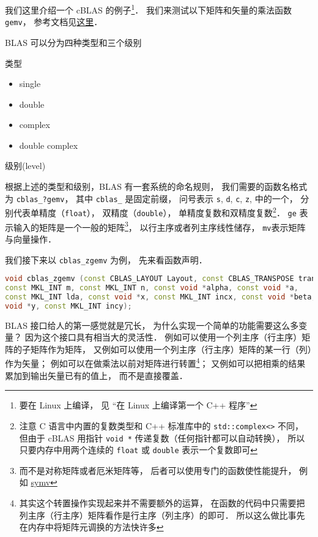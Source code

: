我们这里介绍一个 cBLAS 的例子\footnote{要在 Linux 上编译， 见 “在 Linux 上编译第一个 C++ 程序”}． 我们来测试以下矩阵和矢量的乘法函数 \lstinline|gemv|， 参考文档见\href{https://software.intel.com/en-us/node/834919#88940C4E-0889-46C3-B6CF-F8B6EA6CF4BC}{这里}．

BLAS 可以分为四种类型和三个级别

类型
\begin{itemize}
    \item single
    \item double
    \item complex
    \item double complex
\end{itemize}

级别(level)

根据上述的类型和级别，BLAS 有一套系统的命名规则，
我们需要的函数名格式为 \lstinline|cblas_?gemv|， 其中 \lstinline|cblas_| 是固定前缀， 问号表示 \lstinline|s|, \lstinline|d|, \lstinline|c|, \lstinline|z|, 中的一个， 分别代表单精度（\lstinline|float|）， 双精度（\lstinline|double|）， 单精度复数和双精度复数\footnote{注意 C 语言中内置的复数类型和 C++ 标准库中的 \lstinline|std::complex<>| 不同， 但由于 cBLAS 用指针 \lstinline|void *| 传递复数（任何指针都可以自动转换）， 所以只要内存中用两个连续的 \lstinline|float| 或 \lstinline|double| 表示一个复数即可}． \lstinline|ge| 表示输入的矩阵是一个一般的矩阵\footnote{而不是对称矩阵或者厄米矩阵等， 后者可以使用专门的函数使性能提升， 例如 \href{https://software.intel.com/en-us/node/834934}{symv}}， 以行主序或者列主序线性储存， \lstinline|mv|表示矩阵与向量操作． 



我们接下来以 \lstinline|cblas_zgemv| 为例， 先来看函数声明．
\begin{lstlisting}[language=cpp]
void cblas_zgemv (const CBLAS_LAYOUT Layout, const CBLAS_TRANSPOSE trans,
const MKL_INT m, const MKL_INT n, const void *alpha, const void *a,
const MKL_INT lda, const void *x, const MKL_INT incx, const void *beta,
void *y, const MKL_INT incy);
\end{lstlisting}

BLAS 接口给人的第一感觉就是冗长， 为什么实现一个简单的功能需要这么多变量？ 因为这个接口具有相当大的灵活性． 例如可以使用一个列主序（行主序）矩阵的子矩阵作为矩阵， 又例如可以使用一个列主序（行主序）矩阵的某一行（列）作为矢量； 例如可以在做乘法以前对矩阵进行转置\footnote{其实这个转置操作实现起来并不需要额外的运算， 在函数的代码中只需要把列主序（行主序）矩阵看作是行主序（列主序）的即可． 所以这么做比事先在内存中将矩阵元调换的方法快许多}； 又例如可以把相乘的结果累加到输出矢量已有的值上， 而不是直接覆盖．


